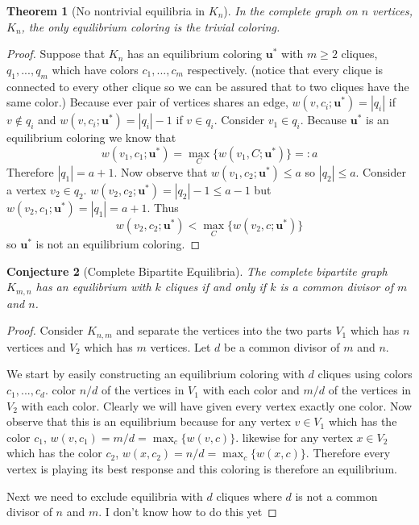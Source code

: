 \documentclass[]{article}
\newtheorem{theorem}{Theorem}
\newtheorem{conjecture}[theorem]{Conjecture}
\begin{document}
\begin{theorem}[No nontrivial equilibria in $K_n$]
	In the complete graph on $n$ vertices, $K_n$, the only equilibrium coloring is the trivial coloring.
\end{theorem} 
\begin{proof} Suppose that $K_n$ has an equilibrium coloring $\mathbf{u}^*$ with $m\geq 2$ cliques, $q_1,...,q_m$ which have colors $c_1,...,c_m$ respectively. (notice that every clique is connected to every other clique so we can be assured that to two cliques have the same color.) Because ever pair of vertices shares an edge, $w(v,c_i;\mathbf{u}^*)=|q_i|$ if $v\notin q_i$ and  $w(v,c_i;\mathbf{u}^*)=|q_i|-1$ if $v\in q_i$. Consider $v_1\in q_i$. Because $\mathbf{u}^*$ is an equilibrium coloring we know that
\begin{equation}
	w(v_1,c_1;\mathbf{u}^*)=\max_C\{w(v_1,C;\mathbf{u}^*)\} =:a
\end{equation}
Therefore $|q_1|=a+1$. Now observe that $w(v_1,c_2;\mathbf{u}^*)\leq a $ so $|q_2|\leq a$. Consider a vertex $v_2\in q_2$. $w(v_2,c_2;\mathbf{u}^*)=|q_2|-1\leq a-1$ but $w(v_2,c_1;\mathbf{u}^*)=|q_1|=a+1$. Thus
\begin{equation}
	w(v_2,c_2;\mathbf{u}^*)<\max_C\{w(v_2,c;\mathbf{u}^*)\}
\end{equation}
so $\mathbf{u}^*$ is not an equilibrium coloring. 
\end{proof} 

\begin{conjecture}[Complete Bipartite Equilibria]
	The complete bipartite graph $K_{m,n}$ has an equilibrium with $k$ cliques if and only if $k$ is a common divisor of $m$ and $n$.  
\end{conjecture}
\begin{proof}
		Consider $K_{n,m}$ and separate the vertices into the two parts $V_1$ which has $n$ vertices and $V_2$ which has $m$ vertices. Let $d$ be a common divisor of $m$ and $n$. 
		
		We start by easily constructing an equilibrium coloring with $d$ cliques using colors $c_1,...,c_d$. color $n/d$ of the vertices in $V_1$ with each color and $m/d$ of the vertices in $V_2$ with each color. Clearly we will have given every vertex exactly one color. Now observe that this is an equilibrium because for any vertex $v\in V_1$ which has the color $c_1$, $w(v,c_1)=m/d=\max_c\{w(v,c)\}.$ likewise for any vertex $x\in V_2$ which has the color $c_2$, $w(x,c_2)=n/d=\max_c\{w(x,c)\}.$ Therefore every vertex is playing its best response and this coloring is therefore an equilibrium. 
		
		Next we need to exclude equilibria with $d$ cliques where $d$ is not a common divisor of $n$ and $m$. I don't know how to do this yet
\end{proof} 
\end{document}
